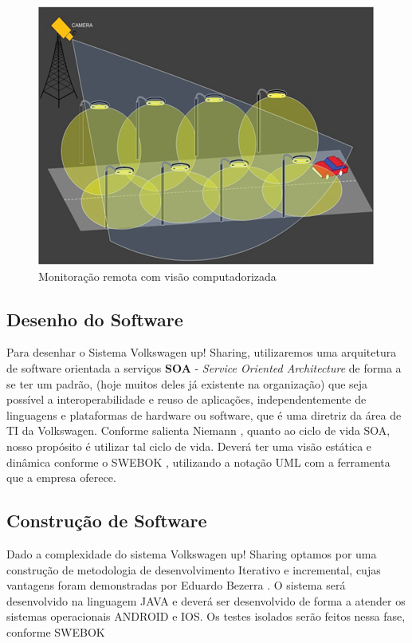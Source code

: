 \documentclass[12pt]{article}
\begin{document}
\begin{figure}[htp]
\centering
\includegraphics[scale=.8] {swebok_requisitos.png}
\caption{Monitoração remota com visão computadorizada}
\label{fig:exampleFig1}
\end{figure}

\subsection{Desenho do Software}

Para desenhar o Sistema Volkswagen up! Sharing, utilizaremos uma arquitetura de software orientada a serviços \textbf{SOA} - \textit{Service Oriented Architecture} de forma a se ter um padrão, (hoje muitos deles já existente na organização) que seja possível a interoperabilidade e reuso de aplicações, independentemente de linguagens e plataformas de hardware ou software, que é uma diretriz da área de TI da Volkswagen. Conforme salienta Niemann \cite{Niemann2008}, quanto ao ciclo de vida SOA, nosso propósito é utilizar tal ciclo de vida. 
Deverá ter uma visão estática e dinâmica conforme o SWEBOK \cite{Swebok}, utilizando a notação UML com a ferramenta que a empresa oferece.


\subsection{Construção de Software}

Dado a complexidade do sistema Volkswagen up! Sharing optamos por uma construção de metodologia de desenvolvimento Iterativo e incremental, cujas vantagens foram demonstradas por Eduardo Bezerra \cite{Bezerra}.
O sistema será desenvolvido na linguagem JAVA e deverá ser desenvolvido de forma a atender os sistemas operacionais ANDROID e IOS.
Os testes isolados serão feitos nessa fase, conforme SWEBOK \cite{Swebok}
\end{document}
